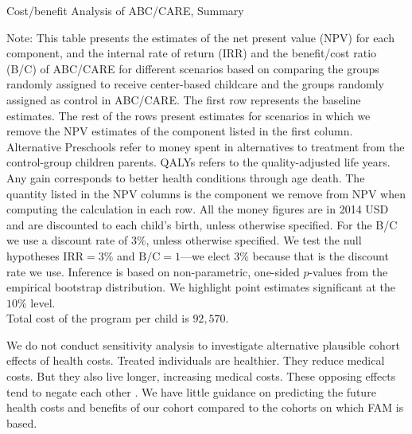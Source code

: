 \begin{table}[H]
\centering
\caption{Cost/benefit Analysis of ABC/CARE, Summary}\label{table:cba}
\begin{threeparttable}
\scriptsize

\begin{tablenotes}
\footnotesize
\item Note: This table presents the estimates of the net present value (NPV) for each component, and the internal rate of return (IRR) and the benefit/cost ratio (B/C) of ABC/CARE for different scenarios based on comparing the groups randomly assigned to receive center-based childcare and the groups randomly assigned as control in ABC/CARE. The first row represents the baseline estimates. The rest of the rows present estimates for scenarios in which we remove the NPV estimates of the component listed in the first column. Alternative Preschools refer to money spent in alternatives to treatment from the control-group children parents. QALYs refers to the quality-adjusted life years. Any gain corresponds to better health conditions through age death. The quantity listed in the NPV columns is the component we remove from NPV when computing the calculation in each row. All the money figures are in 2014 USD and are discounted to each child's birth, unless otherwise specified. For the B/C we use a discount rate of $3\%$, unless otherwise specified. We test the null hypotheses $\text{IRR} = 3\%$ and $\text{B/C} = 1$---we elect $3\%$ because that is the discount rate we use. Inference is based on non-parametric, one-sided $p$-values from the empirical bootstrap distribution. We highlight point estimates significant at the $10\%$ level.\\
    Total cost of the program per child is $92,570$.
\end{tablenotes}
\end{threeparttable}
\end{table}

We do not conduct sensitivity analysis to investigate alternative plausible cohort effects of health costs. Treated individuals are healthier. They reduce medical costs. But they also live longer, increasing medical costs. These opposing effects tend to negate each other \citep{Goldman_etal_2015_Future-America-Model}. We have little guidance on predicting the future health costs and benefits of our cohort compared to the cohorts on which FAM is based.

